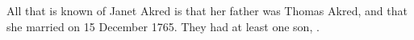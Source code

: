 
All that is known of Janet Akred is that her father was Thomas Akred, and that she married  on 15 December 1765.
They had at least one son, .
